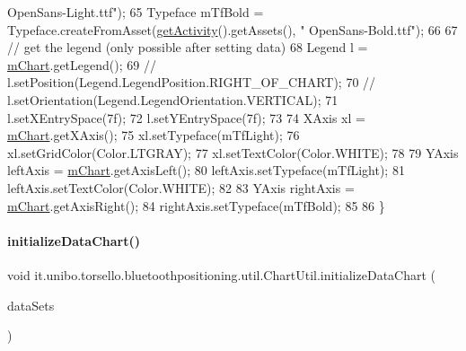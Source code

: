 \begin{DoxyCode}
{      OpenSans-Light.ttf"});
65         Typeface mTfBold = Typeface.createFromAsset(\hyperlink{classit_1_1unibo_1_1torsello_1_1bluetoothpositioning_1_1util_1_1ChartUtil_a59150a6d20b6d0ad2fcf8c1ba858d355_a59150a6d20b6d0ad2fcf8c1ba858d355}{getActivity}().getAssets(), \textcolor{stringliteral}{"
      OpenSans-Bold.ttf"});
66 
67         \textcolor{comment}{// get the legend (only possible after setting data)}
68         Legend l = \hyperlink{classit_1_1unibo_1_1torsello_1_1bluetoothpositioning_1_1util_1_1ChartUtil_a60b5bd6796cc5dcde12d9a6bb3e67c86_a60b5bd6796cc5dcde12d9a6bb3e67c86}{mChart}.getLegend();
69 \textcolor{comment}{//        l.setPosition(Legend.LegendPosition.RIGHT\_OF\_CHART);}
70 \textcolor{comment}{//        l.setOrientation(Legend.LegendOrientation.VERTICAL);}
71         l.setXEntrySpace(7f);
72         l.setYEntrySpace(7f);
73 
74         XAxis xl = \hyperlink{classit_1_1unibo_1_1torsello_1_1bluetoothpositioning_1_1util_1_1ChartUtil_a60b5bd6796cc5dcde12d9a6bb3e67c86_a60b5bd6796cc5dcde12d9a6bb3e67c86}{mChart}.getXAxis();
75         xl.setTypeface(mTfLight);
76         xl.setGridColor(Color.LTGRAY);
77         xl.setTextColor(Color.WHITE);
78 
79         YAxis leftAxis = \hyperlink{classit_1_1unibo_1_1torsello_1_1bluetoothpositioning_1_1util_1_1ChartUtil_a60b5bd6796cc5dcde12d9a6bb3e67c86_a60b5bd6796cc5dcde12d9a6bb3e67c86}{mChart}.getAxisLeft();
80         leftAxis.setTypeface(mTfLight);
81         leftAxis.setTextColor(Color.WHITE);
82 
83         YAxis rightAxis = \hyperlink{classit_1_1unibo_1_1torsello_1_1bluetoothpositioning_1_1util_1_1ChartUtil_a60b5bd6796cc5dcde12d9a6bb3e67c86_a60b5bd6796cc5dcde12d9a6bb3e67c86}{mChart}.getAxisRight();
84         rightAxis.setTypeface(mTfBold);
85 
86     \}
\end{DoxyCode}
\hypertarget{classit_1_1unibo_1_1torsello_1_1bluetoothpositioning_1_1util_1_1ChartUtil_a3393d9aa353849188c02a63d64f2dd2d_a3393d9aa353849188c02a63d64f2dd2d}{}\label{classit_1_1unibo_1_1torsello_1_1bluetoothpositioning_1_1util_1_1ChartUtil_a3393d9aa353849188c02a63d64f2dd2d_a3393d9aa353849188c02a63d64f2dd2d} 
\paragraph{\texorpdfstring{initialize\+Data\+Chart()}{initializeDataChart()}}
{\footnotesize\ttfamily void it.\+unibo.\+torsello.\+bluetoothpositioning.\+util.\+Chart\+Util.\+initialize\+Data\+Chart (\begin{DoxyParamCaption}\item[{Array\+List$<$ I\+Line\+Data\+Set $>$}]{data\+Sets }\end{DoxyParamCaption})\hspace{0.3cm}{\ttfamily [private]}}


